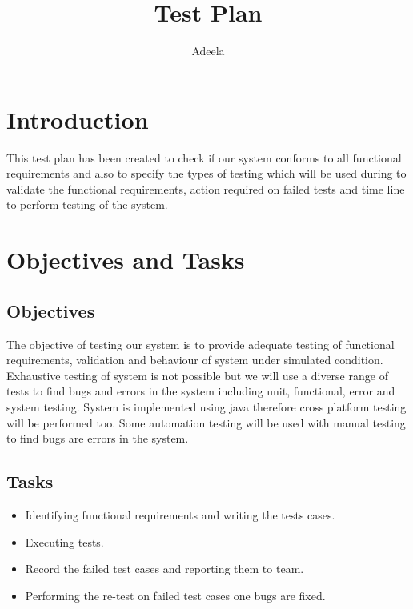 \documentclass[11pt, oneside]{article}   	%
\title{Test Plan}
\author{Adeela}
\begin{document}
\maketitle
\section{Introduction}
This test plan has been created to check if our system conforms to all functional requirements and also to specify the types of testing which will be used during to validate the functional requirements, action required on failed tests and time line to perform testing of the system.
\section{Objectives and Tasks}
\subsection{Objectives}
The objective of testing our system is to provide adequate testing of functional requirements, validation and behaviour of system under simulated condition. Exhaustive testing of system is not possible but we will use a diverse range of tests to find bugs and errors in the system including unit, functional, error and system testing. System is implemented using java therefore cross platform testing will be performed too. Some automation testing will be used with manual testing to find bugs are errors in the system.
\subsection{Tasks}
\begin{itemize}
\item Identifying functional requirements and writing the tests cases.
\item Executing tests.
\item Record the failed test cases and reporting them to team.
\item Performing the re-test on failed test cases one bugs are fixed.
\end{itemize}
\end{document}
